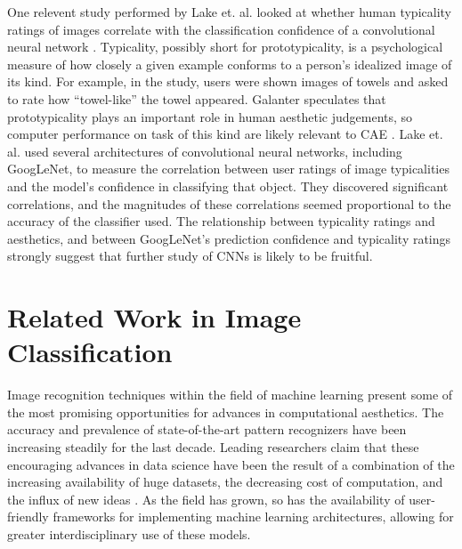 \documentclass[midd]{thesis}
\begin{document}
One relevent study performed by Lake et. al. looked at whether human typicality ratings of images correlate with the classification confidence of a convolutional neural network \cite{lakedeep}. Typicality, possibly short for prototypicality, is a psychological measure of how closely a given example conforms to a person's idealized image of its kind. For example, in the study, users were shown images of towels and asked to rate how ``towel-like'' the towel appeared. Galanter speculates that prototypicality plays an important role in human aesthetic judgements, so computer performance on task of this kind are likely relevant to CAE \cite{galanter-4}. Lake et. al. used several architectures of convolutional neural networks, including GoogLeNet, to measure the correlation between user ratings of image typicalities and the model's confidence in classifying that object. They discovered significant correlations, and the magnitudes of these correlations seemed proportional to the accuracy of the classifier used. The relationship between typicality ratings and aesthetics, and between GoogLeNet's prediction confidence and typicality ratings strongly suggest that further study of CNNs is likely to be fruitful.





















\section{Related Work in Image Classification}

Image recognition techniques within the field of machine learning present some of the most promising opportunities for advances in computational aesthetics. The accuracy and prevalence of state-of-the-art pattern recognizers have been increasing steadily for the last decade. Leading researchers claim that these encouraging advances in data science have been the result of a combination of the increasing availability of huge datasets, the decreasing cost of computation, and the influx of new ideas \cite{szegedy2014going}. As the field has grown, so has the availability of user-friendly frameworks for implementing machine learning architectures, allowing for greater interdisciplinary use of these models.
\end{document}
